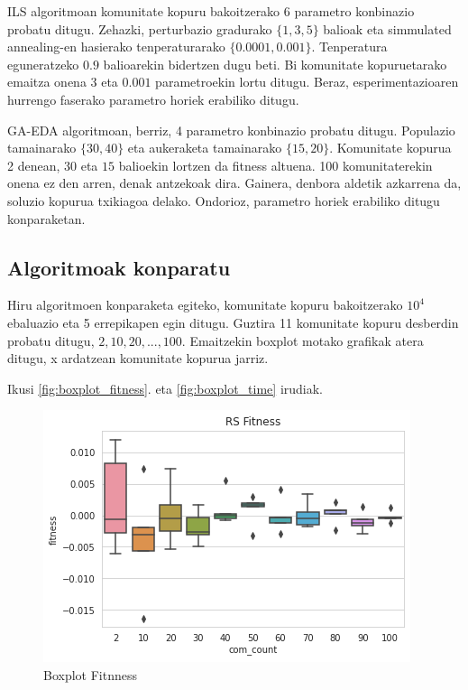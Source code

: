 \documentclass[sigconf]{acmart}
\begin{document}
ILS algoritmoan komunitate kopuru bakoitzerako 6 parametro konbinazio probatu ditugu. Zehazki, perturbazio gradurako $\{1, 3, 5\}$ balioak eta simmulated annealing-en hasierako tenperaturarako $\{0.0001, 0.001\}$. Tenperatura eguneratzeko $0.9$ balioarekin bidertzen dugu beti. Bi komunitate kopuruetarako emaitza onena $3$ eta $0.001$ parametroekin lortu ditugu. Beraz, esperimentazioaren hurrengo faserako parametro horiek erabiliko ditugu.

GA-EDA algoritmoan, berriz, 4 parametro konbinazio probatu ditugu. Populazio tamainarako $\{30, 40\}$ eta aukeraketa tamainarako $\{15, 20\}$. Komunitate kopurua 2 denean, $30$ eta $15$ balioekin lortzen da fitness altuena. 100 komunitaterekin onena ez den arren, denak antzekoak dira. Gainera, denbora aldetik azkarrena da, soluzio kopurua txikiagoa delako. Ondorioz, parametro horiek erabiliko ditugu konparaketan.

\subsection{Algoritmoak konparatu}
Hiru algoritmoen konparaketa egiteko, komunitate kopuru bakoitzerako $10^4$ ebaluazio eta 5 errepikapen egin ditugu. Guztira 11 komunitate kopuru desberdin probatu ditugu, $2, 10, 20, ..., 100$. Emaitzekin boxplot motako grafikak atera ditugu, x ardatzean komunitate kopurua jarriz.

Ikusi \ref{fig:boxplot_fitness}. eta \ref{fig:boxplot_time} irudiak.

\begin{figure}
    \centering
    \includegraphics[width=\linewidth]{boxplot_fitness}
    \caption{Boxplot Fitnness}
    \label{fig:boxplot}
\end{figure}
\end{document}
